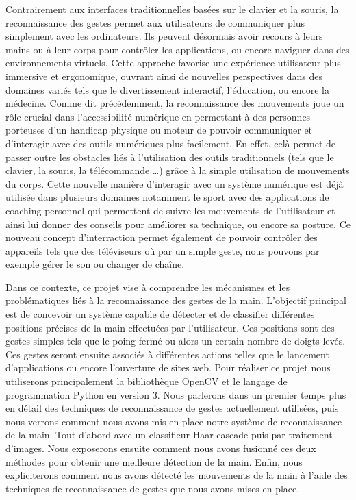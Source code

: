 \documentclass[11pt]{article}
\begin{document}
Contrairement aux interfaces traditionnelles basées sur le clavier et la souris, la reconnaissance des gestes permet aux utilisateurs de communiquer plus simplement avec les ordinateurs. Ils peuvent désormais avoir recours à leurs mains ou à leur corps pour contrôler les applications, ou encore naviguer dans des environnements virtuels. Cette approche favorise une expérience utilisateur plus immersive et ergonomique, ouvrant ainsi de nouvelles perspectives dans des domaines variés tels que le divertissement interactif, l'éducation, ou encore la médecine. Comme dit précédemment, la reconnaissance des mouvements joue un rôle crucial dans l’accessibilité numérique en permettant à des personnes porteuses d'un handicap physique  ou moteur de pouvoir communiquer et d'interagir avec des outils numériques plus facilement. En effet, celà permet de passer outre les obstacles liés à l’utilisation des outils traditionnels (tels que le clavier, la souris, la télécommande …) grâce à la simple utilisation de mouvements du corps. Cette nouvelle manière d'interagir avec un système numérique est déjà utilisée dans plusieurs domaines notamment le sport avec des applications de coaching personnel qui permettent de suivre les mouvements de l'utilisateur et ainsi lui donner des conseils pour améliorer sa technique, ou encore sa posture. Ce nouveau concept d'interraction permet également de pouvoir contrôler des appareils tels que des téléviseurs où par un simple geste, nous pouvons par exemple gérer le son ou changer de chaîne. \bigbreak

Dans ce contexte, ce projet vise à comprendre les mécanismes et les problématiques liés à la reconnaissance des gestes de la main.
L'objectif principal est de concevoir un système capable de détecter et de classifier différentes positions précises de la main effectuées par l'utilisateur.
Ces positions sont des gestes simples tels que le poing fermé ou alors un certain nombre de doigts levés.
Ces gestes seront ensuite associés à différentes actions telles que le lancement d'applications ou encore l'ouverture de sites web.
Pour réaliser ce projet nous utiliserons principalement la bibliothèque OpenCV et le langage de programmation Python en version 3.
Nous parlerons dans un premier temps plus en détail des techniques de reconnaissance de gestes actuellement utilisées, puis nous verrons comment nous avons mis en place notre système de reconnaissance de la main. Tout d'abord avec un classifieur Haar-cascade puis par traitement d'images. Nous exposerons ensuite comment nous avons fusionné ces deux méthodes pour obtenir une meilleure détection de la main. Enfin, nous expliciterons comment nous avons détecté les mouvements de la main à l'aide des techniques de reconnaissance de gestes que nous avons mises en place.
\end{document}
